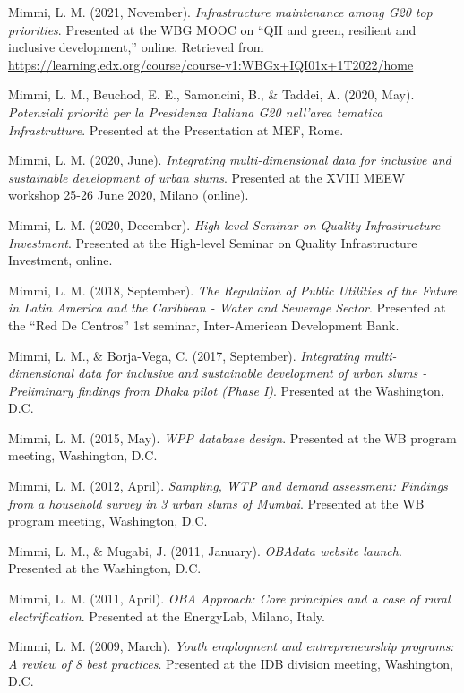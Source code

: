 \documentclass[11pt,a4paper,]{awesome-cv}
\begin{document}
\leavevmode{}%
Mimmi, L. M. (2021, November). \emph{Infrastructure maintenance among
G20 top priorities}. Presented at the WBG MOOC on {``QII and green,
resilient and inclusive development,''} online. Retrieved from
\url{https://learning.edx.org/course/course-v1:WBGx+IQI01x+1T2022/home}

\leavevmode{}%
Mimmi, L. M., Beuchod, E. E., Samoncini, B., \& Taddei, A. (2020, May).
\emph{Potenziali priorità per la Presidenza Italiana G20 nell'area
tematica Infrastrutture}. Presented at the Presentation at MEF, Rome.

\leavevmode{}%
Mimmi, L. M. (2020, June). \emph{Integrating multi-dimensional data for
inclusive and sustainable development of urban slums}. Presented at the
XVIII MEEW workshop 25-26 June 2020, Milano (online).

\leavevmode{}%
Mimmi, L. M. (2020, December). \emph{High-level Seminar on Quality
Infrastructure Investment}. Presented at the High-level Seminar on
Quality Infrastructure Investment, online.

\leavevmode{}%
Mimmi, L. M. (2018, September). \emph{The Regulation of Public Utilities
of the Future in Latin America and the Caribbean - Water and Sewerage
Sector}. Presented at the {``Red De Centros''} 1st seminar,
Inter-American Development Bank.

\leavevmode{}%
Mimmi, L. M., \& Borja-Vega, C. (2017, September). \emph{Integrating
multi-dimensional data for inclusive and sustainable development of
urban slums - Preliminary findings from Dhaka pilot (Phase I)}.
Presented at the Washington, D.C.

\leavevmode{}%
Mimmi, L. M. (2015, May). \emph{WPP database design}. Presented at the
WB program meeting, Washington, D.C.

\leavevmode{}%
Mimmi, L. M. (2012, April). \emph{Sampling, WTP and demand assessment:
Findings from a household survey in 3 urban slums of Mumbai}. Presented
at the WB program meeting, Washington, D.C.

\leavevmode{}%
Mimmi, L. M., \& Mugabi, J. (2011, January). \emph{OBAdata website
launch}. Presented at the Washington, D.C.

\leavevmode{}%
Mimmi, L. M. (2011, April). \emph{OBA Approach: Core principles and a
case of rural electrification}. Presented at the EnergyLab, Milano,
Italy.

\leavevmode{}%
Mimmi, L. M. (2009, March). \emph{Youth employment and entrepreneurship
programs: A review of 8 best practices}. Presented at the IDB division
meeting, Washington, D.C.
\end{document}
